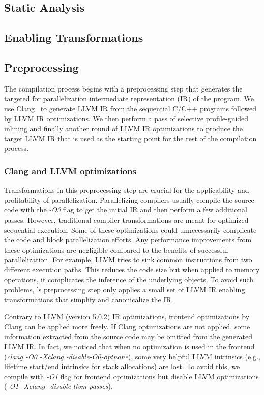 \subsection {Static Analysis}


\subsection{Enabling Transformations}
\label{design_transf}



\subsection{Preprocessing}

The compilation process begins with a preprocessing step that
generates the targeted for parallelization intermediate representation
(IR) of the program. We use Clang~\cite{LLVM:CGO04} to generate LLVM IR
from the sequential C/C++ programs followed by LLVM IR optimizations.
We then perform a pass of selective profile-guided
inlining and finally another round of LLVM IR optimizations to produce
the target LLVM IR that is used as the starting point for the rest of
the compilation process.

\subsubsection{Clang and LLVM optimizations}

Transformations in this preprocessing step are crucial for the
applicability and profitability of parallelization.
%
Parallelizing compilers usually compile the source code with the \textit{-O3}
flag to get the initial IR and then perform a few additional
passes.
However, traditional compiler transformations are meant for optimized
sequential execution.
%
Some of these optimizations could unnecessarily complicate the code
and block parallelization efforts.
%
Any performance improvements from these optimizations are negligible
compared to the benefits of successful parallelization.
%
For example, LLVM tries to sink common instructions from two different
execution paths. This reduces the code size but when applied to memory
operations, it complicates the inference of the underlying objects.
%
To avoid such problems, \namensp 's preprocessing step only applies a
small set of LLVM IR enabling transformations that simplify and
canonicalize the IR.

Contrary to LLVM (version 5.0.2) IR optimizations, frontend optimizations by Clang can
be applied more freely.
%
If Clang optimizations are not applied, some information extracted
from the source code may be omitted from the generated LLVM IR.  In
fact, we noticed that when no optimization is used in the frontend
(\textit{clang -O0 -Xclang -disable-O0-optnone}), some very helpful
LLVM intrinsics (e.g., lifetime start/end intrinsics for stack
allocations) are lost.  To avoid this, we compile with \textit{-O1} flag for
frontend optimizations but disable LLVM optimizations (\textit{-O1
-Xclang -disable-llvm-passes}).


